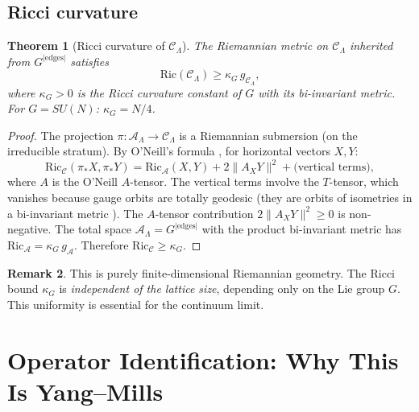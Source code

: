\documentclass[11pt]{article}
\newtheorem{theorem}{Theorem}[section]
\theoremstyle{definition}
\newtheorem{remark}[theorem]{Remark}
\newcommand{\calA}{\mathcal{A}}
\newcommand{\calC}{\mathcal{C}}
\newcommand{\Ric}{\mathrm{Ric}}
\begin{document}
\subsection{Ricci curvature}

\begin{theorem}[Ricci curvature of $\calC_\Lambda$]\label{thm:ricci}
The Riemannian metric on $\calC_\Lambda$ inherited from $G^{|\text{edges}|}$ satisfies
\begin{equation}
    \Ric(\calC_\Lambda) \geq \kappa_G\, g_{\calC_\Lambda},
\end{equation}
where $\kappa_G > 0$ is the Ricci curvature constant of $G$ with its bi-invariant metric. For $G = SU(N)$: $\kappa_G = N/4$.
\end{theorem}

\begin{proof}
The projection $\pi: \calA_\Lambda \to \calC_\Lambda$ is a Riemannian submersion (on the irreducible stratum). By O'Neill's formula \cite{ONeill66}, for horizontal vectors $X, Y$:
\begin{equation}
    \Ric_{\calC}(\pi_* X, \pi_* Y) = \Ric_{\calA}(X, Y) + 2\|A_X Y\|^2 + \text{(vertical terms)},
\end{equation}
where $A$ is the O'Neill $A$-tensor. The vertical terms involve the $T$-tensor, which vanishes because gauge orbits are totally geodesic (they are orbits of isometries in a bi-invariant metric \cite{Singer78}). The $A$-tensor contribution $2\|A_X Y\|^2 \geq 0$ is non-negative. The total space $\calA_\Lambda = G^{|\text{edges}|}$ with the product bi-invariant metric has $\Ric_{\calA} = \kappa_G\, g_{\calA}$. Therefore $\Ric_{\calC} \geq \kappa_G$.
\end{proof}

\begin{remark}
This is purely finite-dimensional Riemannian geometry. The Ricci bound $\kappa_G$ is \emph{independent of the lattice size}, depending only on the Lie group $G$. This uniformity is essential for the continuum limit.
\end{remark}


\section{Operator Identification: Why This Is Yang--Mills}
\label{sec:identification}
\end{document}
